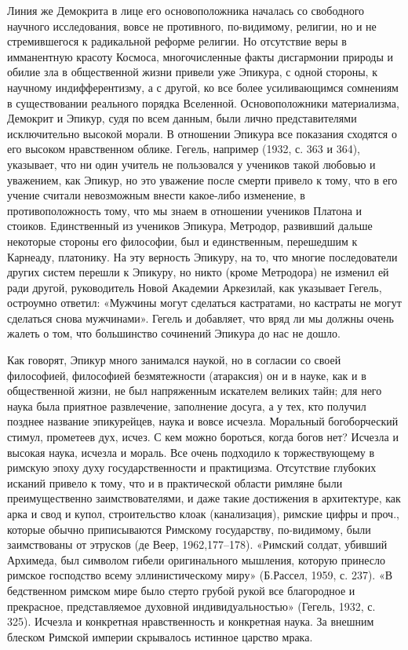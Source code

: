 Линия же Демокрита  в лице его основоположника  началась со свободного
научного исследования, вовсе не противного, по-видимому, религии, но и
не стремившегося к  радикальной реформе религии. Но  отсутствие веры в
имманентную красоту Космоса,  многочисленные факты дисгармонии природы
и  обилие  зла в  общественной  жизни  привели  уже Эпикура,  с  одной
стороны,  к  научному  индифферентизму,  а  с  другой,  ко  все  более
усиливающимся сомнениям  в существовании реального  порядка Вселенной.
Основоположники материализма, Демокрит и  Эпикур, судя по всем данным,
были лично  представителями исключительно высокой морали.  В отношении
Эпикура  все показания  сходятся  о его  высоком нравственном  облике.
Гегель, например (1932, с. 363 и  364), указывает, что ни один учитель
не пользовался  у учеников такой  любовью и уважением, как  Эпикур, но
это уважение  после смерти привело  к тому,  что в его  учение считали
невозможным внести какое-либо изменение, в противоположность тому, что
мы  знаем в  отношении  учеников Платона  и  стоиков. Единственный  из
учеников  Эпикура, Метродор,  развивший дальше  некоторые стороны  его
философии, был  и единственным,  перешедшим к Карнеаду,  платонику. На
эту верность  Эпикуру, на то,  что многие последователи  других систем
перешли  к Эпикуру,  но никто  (кроме  Метродора) не  изменил ей  ради
другой, руководитель  Новой Академии Аркезилай, как  указывает Гегель,
остроумно ответил: «Мужчины могут сделаться кастратами, но кастраты не
могут сделаться снова  мужчинами». Гегель и добавляет, что  вряд ли мы
должны очень жалеть о том, что большинство сочинений Эпикура до нас не
дошло.

Как говорят,  Эпикур много  занимался наукой, но  в согласии  со своей
философией, философией безмятежности (атараксия) он и в науке, как и в
общественной  жизни, не  был напряженным  искателем великих  тайн; для
него  наука была  приятное развлечение,  заполнение досуга,  а у  тех,
кто  получил  позднее название  эпикурейцев,  наука  и вовсе  исчезла.
Моральный  богоборческий стимул,  прометеев  дух, исчез.  С кем  можно
бороться,  когда  богов  нет?  Исчезла  и  высокая  наука,  исчезла  и
мораль.  Все очень  подходило к  торжествующему в  римскую эпоху  духу
государственности и практицизма. Отсутствие глубоких исканий привело к
тому,  что  и  в  практической области  римляне  были  преимущественно
заимствователями, и  даже такие достижения  в архитектуре, как  арка и
свод  и  купол, строительство  клоак  (канализация),  римские цифры  и
проч., которые обычно приписываются Римскому государству, по-видимому,
были  заимствованы  от  этрусков (де  Веер,  1962,177--178).  «Римский
солдат, убивший Архимеда, был  символом гибели оригинального мышления,
которую  принесло  римское  господство  всему  эллинистическому  миру»
(Б.Рассел,  1959, с.  237). «В  бедственном римском  мире было  стерто
грубой  рукой все  благородное и  прекрасное, представляемое  духовной
индивидуальностью»  (Гегель,  1932,  с.  325).  Исчезла  и  конкретная
нравственность и конкретная наука.  За внешним блеском Римской империи
скрывалось истинное царство мрака.

